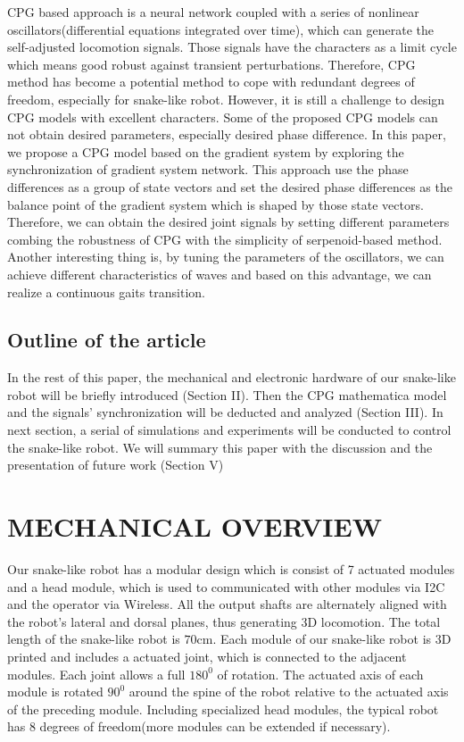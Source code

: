 \documentclass[letterpaper, 10 pt, conference]{ieeeconf}
\begin{document}
CPG based approach is a neural network coupled with a series of nonlinear oscillators(differential equations integrated over time), which can generate the self-adjusted locomotion signals. Those signals have the characters as a limit cycle which means good robust against transient perturbations. Therefore, CPG method has become a potential method to cope with redundant degrees of freedom, especially for snake-like robot.
However, it is still a challenge to design CPG models with excellent characters. Some of the proposed CPG models can not obtain desired parameters, especially desired phase difference. In this paper, we propose a CPG model based on the gradient system by exploring the synchronization of gradient system network. This approach use the phase differences as a group of state vectors and set the desired phase differences as the balance point of the gradient system which is shaped by those state vectors. Therefore, we can obtain the desired joint signals by setting different parameters combing the robustness of CPG with the simplicity of serpenoid-based method. Another interesting thing is, by tuning the parameters of the oscillators, we can achieve different characteristics of waves and based on this advantage, we can realize a continuous gaits transition.

\subsection{Outline of the article}
In the rest of this paper, the mechanical and electronic hardware of our snake-like robot will be briefly introduced (Section II). Then the CPG mathematica model and the signals' synchronization will be deducted and analyzed (Section III). In next section, a serial of simulations and experiments will be conducted to control the snake-like robot. We will summary this paper with the discussion and the presentation of future work (Section V)

\section{MECHANICAL OVERVIEW}
Our snake-like robot has a modular design which is consist of 7 actuated modules and a head module, which is used to communicated with other modules via I2C and the operator via Wireless.
All the output shafts are alternately aligned with the robot's lateral and dorsal planes, thus generating 3D locomotion. The total length of the snake-like robot is $70$cm.
Each module of our snake-like robot is 3D printed and includes a actuated joint, which is connected to the adjacent modules.
Each joint allows a full $180^0$ of rotation. The actuated axis of each module is rotated $90^0$ around the spine of the robot relative to the actuated axis of the preceding module.
Including specialized head modules, the typical robot has 8 degrees of freedom(more modules can be extended if necessary).
\end{document}

